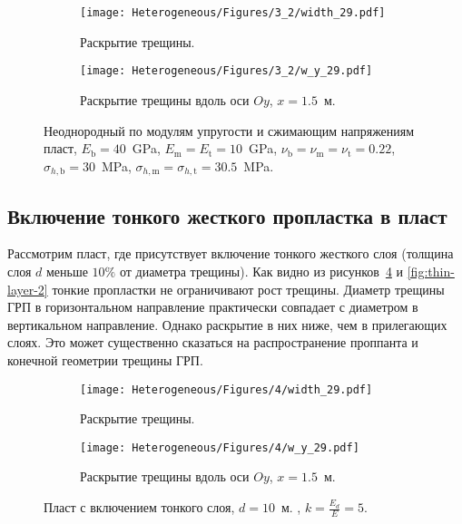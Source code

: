 \begin{figure}[htbp]
    \centering
    \begin{subfigure}[t]{0.4\textwidth}
        \centering
        \texttt{[image: Heterogeneous/Figures/3\_2/width\_29.pdf]}
        \caption{Раскрытие трещины.}
        \label{fig:comparison-2-planar}
    \end{subfigure}
    \hfill 
    \begin{subfigure}[t]{0.55\textwidth}
        \centering
        \texttt{[image: Heterogeneous/Figures/3\_2/w\_y\_29.pdf]}
        \caption{Раскрытие трещины вдоль оси $Oy$, $x=1.5$~м.}
        \label{fig:comparison-2-slice}
    \end{subfigure}
    \caption{Неоднородный по модулям упругости и сжимающим напряжениям пласт, $E_\text{b} = 40$~GPa, $E_\text{m} = E_\text{t} = 10$~GPa, $\nu_\text{b} = \nu_\text{m} = \nu_\text{t} = 0.22$, $\sigma_{h,\text{b}} = 30$~MPa, $\sigma_{h,\text{m}} = \sigma_{h,\text{t}} = 30.5$~MPa.}
    \label{fig:comparison-2}
\end{figure}


\subsection{Включение тонкого жесткого пропластка в пласт}
Рассмотрим пласт, где присутствует включение тонкого жесткого слоя (толщина слоя $d$ меньше $10\%$ от диаметра трещины). Как видно из рисунков~\ref{fig:thin-layer-1} и \ref{fig:thin-layer-2} тонкие пропластки не ограничивают рост трещины. Диаметр трещины ГРП в горизонтальном направление практически совпадает с диаметром в вертикальном направление. Однако раскрытие в них ниже, чем в прилегающих слоях. Это может существенно сказаться на распространение проппанта и конечной геометрии трещины ГРП. 
\begin{figure}[htbp]
    \centering
    \begin{subfigure}[t]{0.4\textwidth}
        \centering
        \texttt{[image: Heterogeneous/Figures/4/width\_29.pdf]}
        \caption{Раскрытие трещины.}
    \end{subfigure}
    \hfill 
    \begin{subfigure}[t]{0.55\textwidth}
        \centering
        \texttt{[image: Heterogeneous/Figures/4/w\_y\_29.pdf]}
        \caption{Раскрытие трещины вдоль оси $Oy$, $x=1.5$~м.}
    \end{subfigure}
    \caption{Пласт с включением тонкого слоя, $d=10$~м. , $k=\frac{E_d}{E}=5$.}
    \label{fig:thin-layer-1}
\end{figure}

